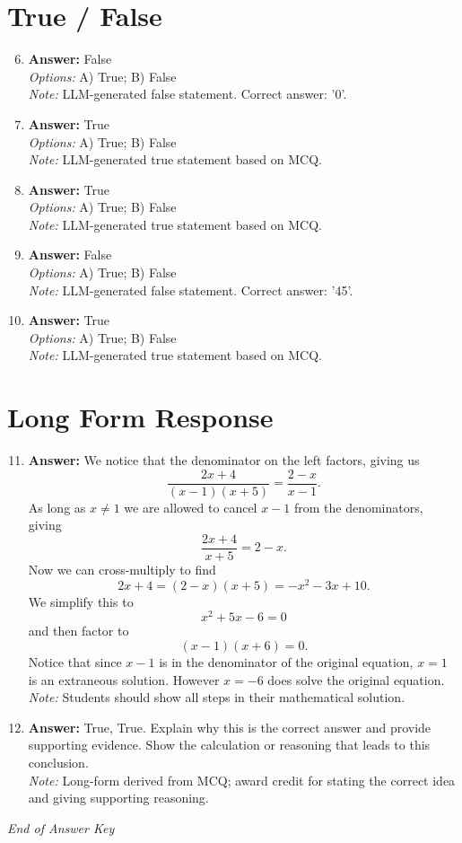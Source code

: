 \documentclass[12pt]{article}
\begin{document}
\section*{True / False}
\begin{enumerate}[label=\arabic*.]
\setcounter{enumi}{5}
\item \textbf{Answer:} False
\\ \textit{Options:} A) True; B) False
\\ \textit{Note:} LLM-generated false statement. Correct answer: '0'.
\item \textbf{Answer:} True
\\ \textit{Options:} A) True; B) False
\\ \textit{Note:} LLM-generated true statement based on MCQ.
\item \textbf{Answer:} True
\\ \textit{Options:} A) True; B) False
\\ \textit{Note:} LLM-generated true statement based on MCQ.
\item \textbf{Answer:} False
\\ \textit{Options:} A) True; B) False
\\ \textit{Note:} LLM-generated false statement. Correct answer: '45'.
\item \textbf{Answer:} True
\\ \textit{Options:} A) True; B) False
\\ \textit{Note:} LLM-generated true statement based on MCQ.
\end{enumerate}

\section*{Long Form Response}
\begin{enumerate}[label=\arabic*.]
\setcounter{enumi}{10}
\item \textbf{Answer:} We notice that the denominator on the left factors, giving us \[\frac{2 x+4}{(x-1)(x+5)}=\frac{2-x}{x-1}.\]As long as $x\neq 1$ we are allowed to cancel $x-1$ from the denominators, giving \[\frac{2 x+4}{x+5}=2-x.\]Now we can cross-multiply to find \[2 x+4=(2-x)(x+5)=-x^2-3 x+10.\]We simplify this to \[x^2+5 x-6=0\]and then factor to \[(x-1)(x+6)=0.\]Notice that since $x-1$ is in the denominator of the original equation, $x=1$ is an extraneous solution. However $x=\boxed{-6}$ does solve the original equation.
\\ \textit{Note:} Students should show all steps in their mathematical solution.
\item \textbf{Answer:} True, True. Explain why this is the correct answer and provide supporting evidence. Show the calculation or reasoning that leads to this conclusion.
\\ \textit{Note:} Long-form derived from MCQ; award credit for stating the correct idea and giving supporting reasoning.
\end{enumerate}

\vfill
\noindent\textit{End of Answer Key}
\end{document}
